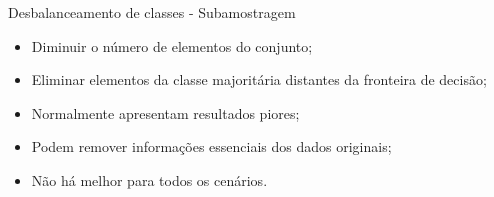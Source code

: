\documentclass{beamer}
\begin{document}
\begin{frame}{Desbalanceamento de classes - Subamostragem}
\setlength\leftmargini{0em}
\justifying
    \begin{itemize}
        \item Diminuir o número de elementos do conjunto;
        \item Eliminar elementos da classe majoritária distantes da fronteira de decisão;
        \item Normalmente apresentam resultados piores;
        \item Podem remover informações essenciais dos dados originais;
        \item Não há melhor para todos os cenários.
    \end{itemize}

\end{frame}
\end{document}
